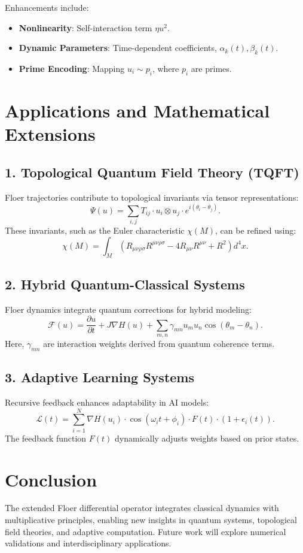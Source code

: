\documentclass{article}
\begin{document}
Enhancements include:
\begin{itemize}
    \item \textbf{Nonlinearity}: Self-interaction term $\eta u^2$.
    \item \textbf{Dynamic Parameters}: Time-dependent coefficients, $\alpha_k(t), \beta_k(t)$.
    \item \textbf{Prime Encoding}: Mapping $u_i \sim p_i$, where $p_i$ are primes.
\end{itemize}

\section*{Applications and Mathematical Extensions}

\subsection*{1. Topological Quantum Field Theory (TQFT)}
Floer trajectories contribute to topological invariants via tensor representations:
\begin{equation}
    \Psi(u) = \sum_{i,j} T_{ij} \cdot u_i \otimes u_j \cdot e^{i(\theta_i - \theta_j)}.
\end{equation}
These invariants, such as the Euler characteristic $\chi(M)$, can be refined using:
\begin{equation}
    \chi(M) = \int_M \left( R_{\mu\nu\rho\sigma}R^{\mu\nu\rho\sigma} - 4R_{\mu\nu}R^{\mu\nu} + R^2 \right) d^4x.
\end{equation}

\subsection*{2. Hybrid Quantum-Classical Systems}
Floer dynamics integrate quantum corrections for hybrid modeling:
\begin{equation}
    \mathcal{F}(u) = \frac{\partial u}{\partial t} + J \nabla H(u) + \sum_{m,n} \gamma_{mn} u_m u_n \cos(\theta_m - \theta_n).
\end{equation}
Here, $\gamma_{mn}$ are interaction weights derived from quantum coherence terms.

\subsection*{3. Adaptive Learning Systems}
Recursive feedback enhances adaptability in AI models:
\begin{equation}
    \mathcal{L}(t) = \sum_{i=1}^N \nabla H(u_i) \cdot \cos(\omega_i t + \phi_i) \cdot F(t) \cdot (1 + \epsilon_i(t)).
\end{equation}
The feedback function $F(t)$ dynamically adjusts weights based on prior states.

\section*{Conclusion}
The extended Floer differential operator integrates classical dynamics with multiplicative principles, enabling new insights in quantum systems, topological field theories, and adaptive computation. Future work will explore numerical validations and interdisciplinary applications.
\end{document}

